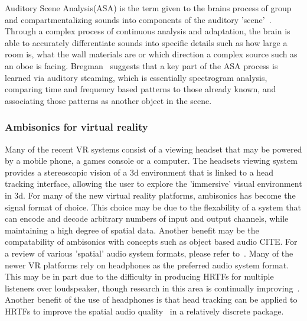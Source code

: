 \documentclass[paper=a4, fontsize=10pt, font=arial]{scrartcl} %
\numberwithin{equation}{section} %
\numberwithin{figure}{section} %
\numberwithin{table}{section} %
\begin{document}
Auditory Scene Analysis(ASA) is the term given to the brains process of group and compartmentalizing sounds into components of the auditory 'scene'~\cite{rumsey2012spatial}. Through a complex process of continuous analysis and adaptation, the brain is able to accurately differentiate sounds into specific details such as how large a room is, what the wall materials are or which direction a complex source such as an oboe is facing. Bregman~\cite{Bregman1994} suggests that a key part of the ASA process is learned via auditory steaming, which is essentially spectrogram analysis, comparing time and frequency based patterns to those already known, and associating those patterns as another object in the scene. 


\subsubsection{Ambisonics for virtual reality}

Many of the recent VR systems consist of a viewing headset that may be powered by a mobile phone, a games console or a computer. The headsets viewing system provides a stereoscopic vision of a 3d environment that is linked to a head tracking interface, allowing the user to explore the 'immersive' visual environment in 3d. For many of the new virtual reality platforms, ambisonics has become the signal format of choice. This choice may be due to the flexability of a system that can encode and decode arbitrary numbers of input and output channels, while maintaining a high degree of spatial data. Another benefit may be the compatability of ambisonics with concepts such as object based audio CITE. For a review of various 'spatial' audio system formats, please refer to~\cite{Wiggins2004}. Many of the newer VR platforms rely on headphones as the preferred audio system format. This may be in part due to the difficulty in producing HRTFs for multiple listeners over loudspeaker, though research in this area is continually improving~\cite{Galvez2016}. Another benefit of the use of headphones is that head tracking can be applied to HRTFs to improve the spatial audio quality~\cite{Inanaga1995} in a relatively discrete package.   \\
\end{document}
